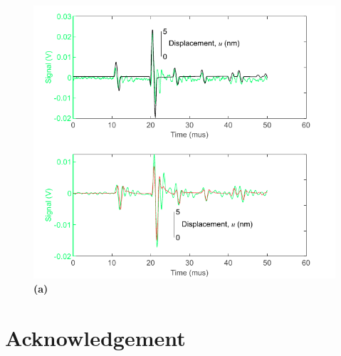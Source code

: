 \documentclass[preprint,3p, 11pt,authoryear]{elsarticle}
\begin{document}
\begin{figure}[ht]
     	\centering
\includegraphics[scale= 1]{FIG10.pdf} 
\caption{\textbf{(a)}  }
	\label{fig10} 
\end{figure}



\section*{Acknowledgement}






 

\end{document}
